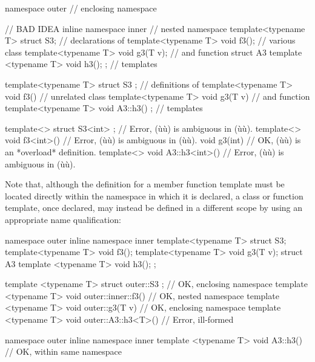 \begin{emcppslisting}[emcppsbatch=e8]
namespace outer                                          // enclosing namespace
{                                                        // BAD IDEA
    inline namespace inner                               // nested namespace
    {
        template<typename T> struct S3;                  // declarations of
        template<typename T> void f3();                  // various class
        template<typename T> void g3(T v);               // and function
        struct A3 { template <typename T> void h3(); };  // templates
    }

    template<typename T> struct S3 { };                  // definitions of
    template<typename T> void f3() { }                   // unrelated class
    template<typename T> void g3(T v) { }                // and function
    template<typename T> void A3::h3() { };              // templates

    template<> struct S3<int> { };     // Error, (ù{}ù) is ambiguous in (ù{}ù).
    template<> void f3<int>() { }      // Error, (ù{}ù) is ambiguous in (ù{}ù).
    void g3(int) { }                   // OK, (ù{}ù) is an *overload* definition.
    template<> void A3::h3<int>() { }  // Error, (ù{}ù) is ambiguous in (ù{}ù).
}
\end{emcppslisting}
    
\noindent Note that, although the definition for a member function template must
be located directly within the namespace in which it is declared, a
class or function template, once declared, may instead be defined in a different
scope by using an appropriate name qualification:

\begin{emcppshiddenlisting}[emcppsbatch=e9]
namespace outer
{
    inline namespace inner
    {
        template<typename T> struct S3;
        template<typename T> void f3();
        template<typename T> void g3(T v);
        struct A3 { template <typename T> void h3(); };
    }
}
\end{emcppshiddenlisting}
\begin{emcppslisting}[emcppsbatch=e9]
template <typename T> struct outer::S3 { };        // OK, enclosing namespace
template <typename T> void outer::inner::f3() { }  // OK, nested namespace
template <typename T> void outer::g3(T v) { }      // OK, enclosing namespace
template <typename T> void outer::A3::h3<T>() { }  // Error, ill-formed

namespace outer
{
    inline namespace inner
    {
        template <typename T> void A3::h3() { }    // OK, within same namespace
    }
}
\end{emcppslisting}
    
